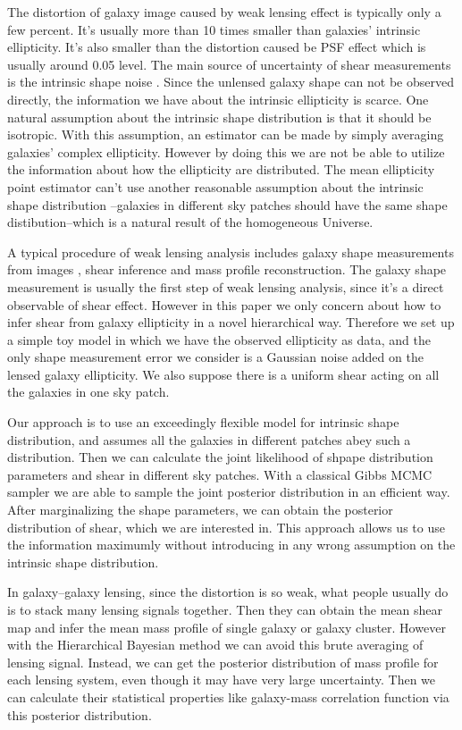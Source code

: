 \documentclass[useAMS,usenatbib]{mn2e}
\begin{document}
The distortion of galaxy image caused by weak lensing effect is typically only a few percent.
It's usually more than 10 times smaller than galaxies' intrinsic ellipticity. It's also smaller than the distortion caused
be PSF effect which is usually around 0.05 level. The main source of uncertainty of shear measurements is the intrinsic shape noise
. Since the unlensed galaxy shape can not be observed directly, the information
we have about the intrinsic ellipticity is scarce. One natural assumption about the intrinsic shape distribution is that 
it should be isotropic. With this assumption, an estimator can be made by simply averaging galaxies' complex
ellipticity. However by doing this we are not be able to utilize the
information about how the ellipticity are distributed. The mean ellipticity
point estimator can't use another reasonable assumption about the intrinsic shape distribution --galaxies in different sky patches should have
the same shape distibution--which is a natural result of the homogeneous Universe.

A typical procedure of weak lensing analysis  includes galaxy shape measurements from images
, shear inference and mass profile reconstruction. The galaxy shape measurement is usually the
first step of weak lensing analysis, since it's a direct observable of shear effect. However
in this paper we only concern about how to infer shear from galaxy
ellipticity in a novel hierarchical way. Therefore we set up a simple toy model in which we have the observed ellipticity as
data, and the only shape measurement error we consider is a Gaussian noise
added on the lensed galaxy ellipticity. We also suppose there is a uniform shear
acting on all the galaxies in one sky patch.

Our approach is to use an exceedingly flexible model for intrinsic
shape distribution, and assumes all the galaxies in different patches
abey such a distribution. Then we can calculate the joint likelihood
of shpape distribution parameters and shear in different sky patches. With
a classical Gibbs MCMC sampler we are able to sample the joint posterior distribution
in an efficient way. After marginalizing the shape parameters, we can obtain
the posterior distribution of shear, which we are interested in. This
approach allows us to use the information maximumly without introducing
in any wrong assumption on the intrinsic shape distribution.

In galaxy--galaxy lensing, since the distortion is so weak, what people
usually do is to stack many lensing signals together. Then they can obtain the mean
shear map and infer the mean mass profile of single galaxy or galaxy
cluster. However with the Hierarchical Bayesian method we can avoid this brute averaging
of lensing signal. Instead, we can get the posterior distribution of mass profile for
each lensing system, even though it may have very large uncertainty. Then we
can calculate their statistical properties like galaxy-mass correlation
function via this posterior distribution.
\end{document}
